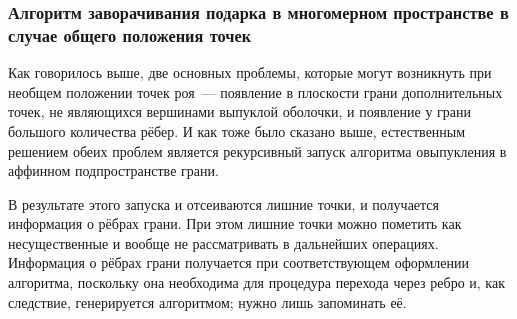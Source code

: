 \documentclass[14pt]{extarticle}
\begin{document}
%
%

\subsubsection{Алгоритм заворачивания подарка в многомерном пространстве в случае общего положения точек}
\label{sec:generic}

Как говорилось выше, две основных проблемы, которые могут возникнуть при необщем положении точек роя~--- появление в плоскости грани дополнительных точек, не являющихся вершинами выпуклой оболочки, и появление у грани большого количества рёбер. И как тоже было сказано выше, естественным решением обеих проблем является рекурсивный запуск алгоритма овыпукления в аффинном подпространстве грани.

В результате этого запуска и отсеиваются лишние точки, и получается информация о рёбрах грани. При этом лишние точки можно пометить как несущественные и вообще не рассматривать в дальнейших операциях. Информация о рёбрах грани получается при соответствующем оформлении алгоритма, поскольку она необходима для процедура перехода через ребро и, как следствие, генерируется алгоритмом; нужно лишь запоминать её.
\end{document}
